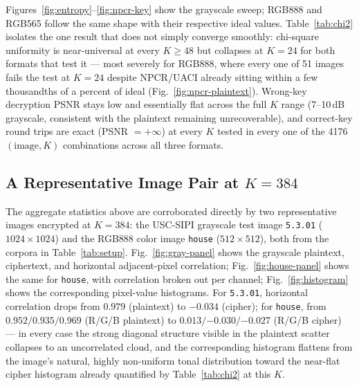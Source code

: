 \documentclass[conference]{IEEEtran}
\begin{document}
Figures~\ref{fig:entropy}--\ref{fig:npcr-key} show the grayscale sweep;
RGB888 and RGB565 follow the same shape with their respective ideal
values. Table~\ref{tab:chi2} isolates the one result that does not simply
converge smoothly: chi-square uniformity is near-universal at every $K
\geq 48$ but collapses at $K=24$ for both formats that test it — most
severely for RGB888, where every one of 51 images fails the test at
$K=24$ despite NPCR/UACI already sitting within a few thousandths of a
percent of ideal (Fig.~\ref{fig:npcr-plaintext}). Wrong-key decryption
PSNR stays low and essentially flat across the full $K$ range (7--10\,dB
grayscale, consistent with the plaintext remaining unrecoverable), and
correct-key round trips are exact (PSNR $=+\infty$) at every $K$ tested in
every one of the 4176 $(\text{image}, K)$ combinations across all three
formats.

\subsection{A Representative Image Pair at $K=384$}
\label{sec:qualitative}

The aggregate statistics above are corroborated directly by two
representative images encrypted at $K=384$: the USC-SIPI grayscale test
image \texttt{5.3.01} ($1024\times1024$) and the RGB888 color image
\texttt{house} ($512\times512$), both from the corpora in
Table~\ref{tab:setup}. Fig.~\ref{fig:gray-panel} shows the grayscale
plaintext, ciphertext, and horizontal adjacent-pixel correlation;
Fig.~\ref{fig:house-panel} shows the same for \texttt{house}, with
correlation broken out per channel; Fig.~\ref{fig:histogram} shows the
corresponding pixel-value histograms. For \texttt{5.3.01}, horizontal
correlation drops from $0.979$ (plaintext) to $-0.034$ (cipher); for
\texttt{house}, from $0.952/0.935/0.969$ (R/G/B plaintext) to
$0.013/{-0.030}/{-0.027}$ (R/G/B cipher) — in every case the strong
diagonal structure visible in the plaintext scatter collapses to an
uncorrelated cloud, and the corresponding histogram flattens from the
image's natural, highly non-uniform tonal distribution toward the
near-flat cipher histogram already quantified by Table~\ref{tab:chi2} at
this $K$.
\end{document}
